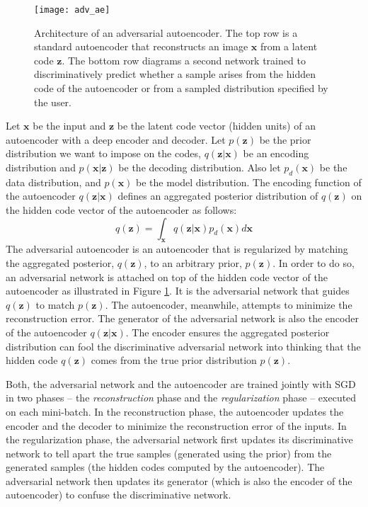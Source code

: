 \documentclass{article}
\begin{document}
\begin{figure}
\begin{center}
\hspace{4cm}\texttt{[image: adv\_ae]}
\end{center}
\caption{\label{fig_adv_ae}Architecture of an adversarial autoencoder.
The top row is a standard autoencoder that reconstructs an image $\mathbf{x}$ from a latent code $\mathbf{z}$.
The bottom row diagrams a second network trained to discriminatively predict whether a sample arises from the hidden code of the autoencoder or from a sampled distribution specified by the user.}
\end{figure}

Let $\mathbf{x}$ be the input and $\mathbf{z}$ be the latent code vector (hidden units) of an autoencoder with a deep encoder and decoder.
Let $p(\mathbf{z})$ be the prior distribution we want to impose on the codes, $q( \mathbf{z} | \mathbf{x})$ be an encoding distribution
and $p( \mathbf{x} | \mathbf{z})$ be the decoding distribution.
Also let $p_{d} (\mathbf{x})$ be the data distribution, and $p(\mathbf{x})$ be the model distribution.
The encoding function of the autoencoder $q( \mathbf{z} | \mathbf{x})$ defines an aggregated posterior distribution of $q(\mathbf{z})$ on the hidden code vector of the autoencoder as follows:
\begin{equation}\label{qz} q(\mathbf{z}) = \int_\mathbf{x} q(\mathbf{z}|\mathbf{x}) p_{d} (\mathbf{x}) d\mathbf{x}
\end{equation}
The adversarial autoencoder is an autoencoder that is regularized by matching the aggregated posterior, $q(\mathbf{z})$, to an arbitrary prior, $p(\mathbf{z})$.
In order to do so, an adversarial network is attached on top of the hidden code vector of the autoencoder as illustrated in Figure \ref{fig_adv_ae}.
It is the adversarial network that guides $q(\mathbf{z})$ to match $p(\mathbf{z})$. The autoencoder, meanwhile, attempts to minimize the
reconstruction error.  The generator of the adversarial network is also the encoder of the autoencoder $q(\mathbf{z}|\mathbf{x})$.
The encoder ensures the aggregated posterior distribution can fool the discriminative adversarial network into thinking that the hidden code $q(\mathbf{z})$ comes from the true prior distribution $p(\mathbf{z})$.


Both, the adversarial network and the autoencoder are trained jointly with SGD in two phases -- the \emph{reconstruction} phase and the \emph{regularization}
phase -- executed on each mini-batch.  In the reconstruction phase, the autoencoder updates the encoder and the decoder to minimize the reconstruction error
of the inputs. In the regularization phase, the adversarial network first updates its discriminative network to tell apart the true samples (generated
using the prior) from the generated samples (the hidden codes computed by the autoencoder). The adversarial network then updates its generator (which is also the encoder of the autoencoder)
to confuse the discriminative network.
\end{document}
